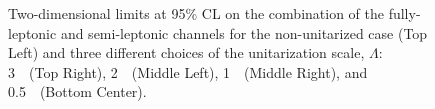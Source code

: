 \begin{figure}[h!]
\begin{center}
\end{center}
\caption{Two-dimensional limits at 95\% CL on the combination of the fully-leptonic and semi-leptonic channels for the non-unitarized case (Top Left)
and three different choices of the unitarization scale, $\Lambda$:
3~\TeV~(Top Right), 2~\TeV~(Middle Left), 1~\TeV~(Middle Right), and 0.5~\TeV~(Bottom Center).}

 \label{fig:aqgc_combined_2d}
 \end{figure}



